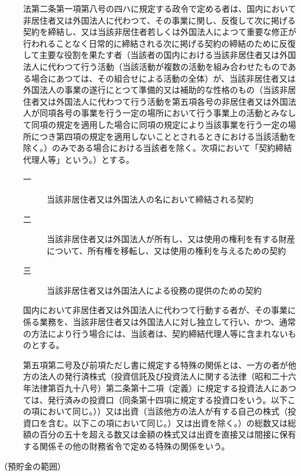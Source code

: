 \documentclass[twocolumn,a4j,10pt]{ltjtarticle}
\begin{document}
\begin{description}
\item[]法第二条第一項第八号の四ハに規定する政令で定める者は、国内において非居住者又は外国法人に代わつて、その事業に関し、反復して次に掲げる契約を締結し、又は当該非居住者若しくは外国法人によつて重要な修正が行われることなく日常的に締結される次に掲げる契約の締結のために反復して主要な役割を果たす者（当該者の国内における当該非居住者又は外国法人に代わつて行う活動（当該活動が複数の活動を組み合わせたものである場合にあつては、その組合せによる活動の全体）が、当該非居住者又は外国法人の事業の遂行にとつて準備的又は補助的な性格のもの（当該非居住者又は外国法人に代わつて行う活動を第五項各号の非居住者又は外国法人が同項各号の事業を行う一定の場所において行う事業上の活動とみなして同項の規定を適用した場合に同項の規定により当該事業を行う一定の場所につき第四項の規定を適用しないこととされるときにおける当該活動を除く。）のみである場合における当該者を除く。次項において「契約締結代理人等」という。）とする。
\begin{description}
\item[一]当該非居住者又は外国法人の名において締結される契約
\item[二]当該非居住者又は外国法人が所有し、又は使用の権利を有する財産について、所有権を移転し、又は使用の権利を与えるための契約
\item[三]当該非居住者又は外国法人による役務の提供のための契約
\end{description}
\item[]国内において非居住者又は外国法人に代わつて行動する者が、その事業に係る業務を、当該非居住者又は外国法人に対し独立して行い、かつ、通常の方法により行う場合には、当該者は、契約締結代理人等に含まれないものとする。
\item[]第五項第二号及び前項ただし書に規定する特殊の関係とは、一方の者が他方の法人の発行済株式（投資信託及び投資法人に関する法律（昭和二十六年法律第百九十八号）第二条第十二項（定義）に規定する投資法人にあつては、発行済みの投資口（同条第十四項に規定する投資口をいう。以下この項において同じ。））又は出資（当該他方の法人が有する自己の株式（投資口を含む。以下この項において同じ。）又は出資を除く。）の総数又は総額の百分の五十を超える数又は金額の株式又は出資を直接又は間接に保有する関係その他の財務省令で定める特殊の関係をいう。
\end{description}
\noindent\hspace{10pt}（預貯金の範囲）
\end{document}
